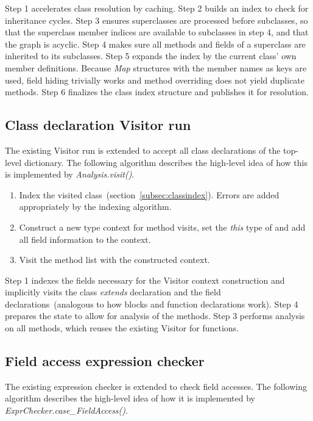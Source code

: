 \documentclass[]{tukportfolio}
\begin{document}
Step 1 accelerates class resolution by caching. Step 2 builds an index to check for inheritance cycles. Step 3 ensures superclasses are processed before subclasses, so that the superclass member indices are available to subclasses in step 4, and that the graph is acyclic. Step 4 makes sure all methods and fields of a superclass are inherited to its subclasses. Step 5 expands the index by the current class' own member definitions. Because \textit{Map} structures with the member names as keys are used, field hiding trivially works and method overriding does not yield duplicate methods. Step 6 finalizes the class index structure and publishes it for resolution.

\subsection{Class declaration Visitor run}

The existing Visitor run is extended to accept all class declarations of the top-level dictionary. The following algorithm describes the high-level idea of how this is implemented by \textit{Analysis.visit()}.

\begin{enumerate}
  \item Index the visited class~(section~\ref{subsec:classindex}). Errors are added appropriately by the indexing algorithm.
  \item Construct a new type context for method visits, set the \textit{this} type of and add all field information to the context.
  \item Visit the method list with the constructed context.
\end{enumerate}

Step 1 indexes the fields necessary for the Visitor context construction and implicitly visits the class \textit{extends} declaration and the field declarations~(analogous to how blocks and function declarations work). Step 4 prepares the state to allow for analysis of the methods. Step 3 performs analysis on all methods, which reuses the existing Visitor for functions.

\subsection{Field access expression checker}

The existing expression checker is extended to check field accesses. The following algorithm describes the high-level idea of how it is implemented by \textit{ExprChecker.case\_FieldAccess()}.
\end{document}
